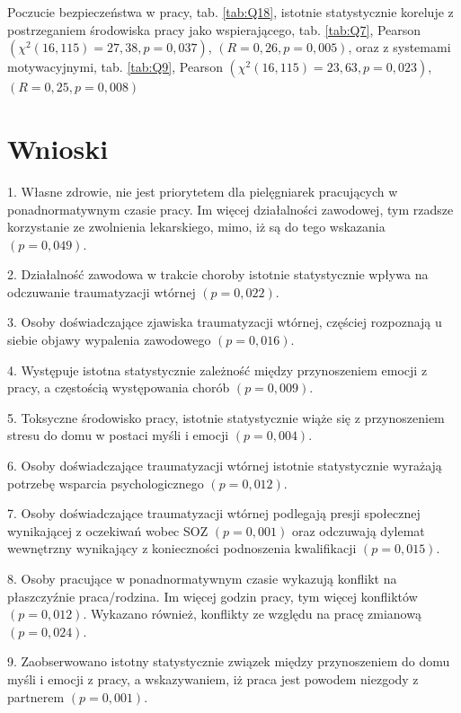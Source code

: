 \documentclass[a4paper,12pt,twoside,openright]{mwrep}
\begin{document}
Poczucie bezpieczeństwa w pracy, tab. \ref{tab:Q18}, istotnie statystycznie koreluje z postrzeganiem środowiska pracy jako wspierającego, tab. \ref{tab:Q7}, Pearson $(\chi^2 (16, 115) = 27,38, p = 0,037)$, $(R = 0,26, p = 0,005)$, oraz z systemami motywacyjnymi, tab. \ref{tab:Q9}, Pearson $(\chi^2 (16, 115) = 23,63, p = 0,023)$, $(R = 0,25, p = 0,008)$
	



\vspace{\baselineskip} 


\chapter*{Wnioski}


1. Własne zdrowie, nie jest priorytetem dla pielęgniarek pracujących w ponadnormatywnym czasie pracy. Im  więcej działalności zawodowej, tym rzadsze korzystanie ze zwolnienia lekarskiego, mimo, iż są do tego wskazania $( p=0,049)$.

2. Działalność zawodowa w trakcie choroby istotnie statystycznie wpływa na odczuwanie traumatyzacji wtórnej $(p = 0,022)$.

3.  Osoby doświadczające zjawiska traumatyzacji wtórnej, częściej rozpoznają u siebie objawy wypalenia zawodowego $( p=0,016)$.

4. Występuje  istotna statystycznie zależność między przynoszeniem emocji z pracy, a częstością występowania chorób $(p=0,009)$.

5. Toksyczne środowisko pracy, istotnie statystycznie wiąże się z przynoszeniem stresu do domu w postaci myśli i emocji $( p = 0,004)$.

6. Osoby doświadczające traumatyzacji wtórnej istotnie statystycznie wyrażają potrzebę wsparcia psychologicznego $(p = 0,012)$.

7. Osoby doświadczające traumatyzacji wtórnej podlegają presji społecznej  wynikającej z oczekiwań wobec SOZ $(p = 0,001)$ oraz odczuwają dylemat wewnętrzny wynikający z konieczności podnoszenia kwalifikacji $ (p = 0,015)$.

8. Osoby pracujące w ponadnormatywnym czasie wykazują konflikt na płaszczyźnie praca/rodzina. Im więcej godzin pracy, tym więcej konfliktów $( p=0,012)$.  Wykazano również, konflikty ze względu na pracę zmianową $(p = 0,024)$.

9. Zaobserwowano istotny statystycznie związek między przynoszeniem do domu myśli i emocji z pracy, a wskazywaniem, iż praca jest powodem niezgody z partnerem $(p = 0,001)$.
\end{document}
